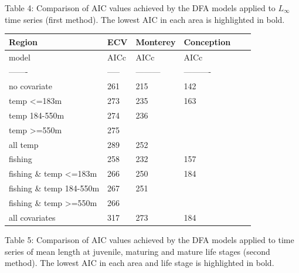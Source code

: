 \documentclass[
]{article}
\begin{document}
Table 4: Comparison of AIC values achieved by the DFA models applied to
\(L_{\infty}\) time series (first method). The lowest AIC in each area
is highlighted in bold.

\begin{longtable}[]{@{}llllll@{}}
\toprule
Region & ECV & Monterey & Conception & & \\
\midrule
\endhead
model & AICc & AICc & AICc & & \\
------- & ----- & --------- & ---------- & & \\
no covariate & 261 & 215 & 142 & & \\
temp \textless=183m & 273 & 235 & 163 & & \\
temp 184-550m & 274 & 236 & & & \\
temp \textgreater=550m & 275 & & & & \\
all temp & 289 & 252 & & & \\
fishing & 258 & 232 & 157 & & \\
fishing \& temp \textless=183m & 266 & 250 & 184 & & \\
fishing \& temp 184-550m & 267 & 251 & & & \\
fishing \& temp \textgreater=550m & 266 & & & & \\
all covariates & 317 & 273 & 184 & & \\
\bottomrule
\end{longtable}

Table 5: Comparison of AIC values achieved by the DFA models applied to
time series of mean length at juvenile, maturing and mature life stages
(second method). The lowest AIC in each area and life stage is
highlighted in bold.
\end{document}
